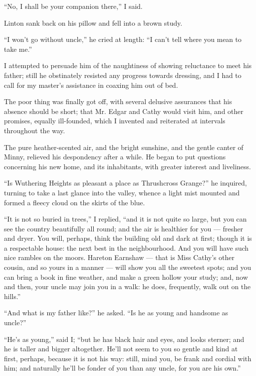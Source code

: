 \par “No, I shall be your companion there,” I said.
\par Linton sank back on his pillow and fell into a brown study.
\par “I won't go without uncle,” he cried at length: “I can't tell where you mean to take me.”
\par I attempted to persuade him of the naughtiness of showing reluctance to meet his father; still he obstinately resisted any progress towards dressing, and I had to call for my master's assistance in coaxing him out of bed.
\par The poor thing was finally got off, with several delusive assurances that his absence should be short; that Mr. Edgar and Cathy would visit him, and other promises, equally ill-founded, which I invented and reiterated at intervals throughout the way.
\par The pure heather-scented air, and the bright sunshine, and the gentle canter of Minny, relieved his despondency after a while. He began to put questions concerning his new home, and its inhabitants, with greater interest and liveliness.
\par “Is Wuthering Heights as pleasant a place as Thrushcross Grange?” he inquired, turning to take a last glance into the valley, whence a light mist mounted and formed a fleecy cloud on the skirts of the blue.
\par “It is not so buried in trees,” I replied, “and it is not quite so large, but you can see the country beautifully all round; and the air is healthier for you — fresher and dryer. You will, perhaps, think the building old and dark at first; though it is a respectable house: the next best in the neighbourhood. And you will have such nice rambles on the moors. Hareton Earnshaw — that is Miss Cathy's other cousin, and so yours in a manner — will show you all the sweetest spots; and you can bring a book in fine weather, and make a green hollow your study; and, now and then, your uncle may join you in a walk: he does, frequently, walk out on the hills.”
\par “And what is my father like?” he asked. “Is he as young and handsome as uncle?”
\par “He's as young,” said I; “but he has black hair and eyes, and looks sterner; and he is taller and bigger altogether. He'll not seem to you so gentle and kind at first, perhaps, because it is not his way: still, mind you, be frank and cordial with him; and naturally he'll be fonder of you than any uncle, for you are his own.”
